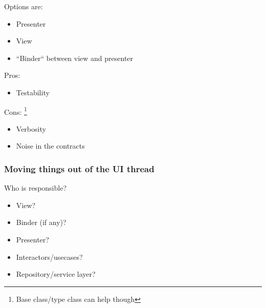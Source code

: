 \documentclass[10pt]{beamer}
\begin{document}
\begin{frame}[fragile]
		\begin{figure}
			\centering
{}
		\end{figure}


\end{frame}











\begin{frame}[fragile]
Options are:
\begin{itemize}
\item Presenter
\item View 
\item ``Binder`` between view and presenter
\end{itemize}
\end{frame}

\begin{frame}[fragile]
Pros:
\begin{itemize}
\item Testability 
\end{itemize}
Cons:%
\footnote{Base class/type class can help though}
\begin{itemize}
\item Verbosity
\item Noise in the contracts 
\end{itemize}
\end{frame}

\begin{frame}[fragile]
\frametitle{Moving things out of the UI thread}
Who is responsible?
\begin{itemize}
\item View?
\item Binder (if any)?
\item Presenter?
\item Interactors/usecases?
\item Repository/service layer?
\end{itemize}
\end{frame}
\end{document}
